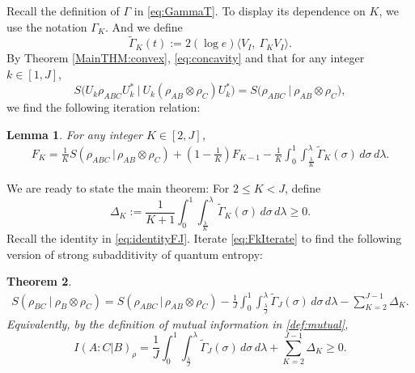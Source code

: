 \documentclass{article}
\numberwithin{equation}{section}
\newtheorem{theorem}{Theorem}[section]
\newtheorem{lemma}[theorem]{Lemma}
\begin{document}
Recall the definition of $\Gamma$ in \eqref{eq:GammaT}. To display its dependence on $K$, we use the notation $\Gamma_{K}$. And we define
\begin{equation}
\tilde{\Gamma}_{K}(t):=2(\log e) \big\langle V_{I},\ \Gamma_{K}V_{I}\big\rangle.
\end{equation}
By Theorem \ref{MainTHM:convex}, \eqref{eq:concavity} and that
for any integer $k\in [1,J]$,
\begin{equation*}
  S\big(  U_k \rho_{ABC} U_k^* \ \big|\  U_k (\rho_{AB} \otimes \rho_{C}) U_k^* \big)=S\big(   \rho_{ABC}  \ \big|\  \rho_{AB} \otimes \rho_{C}  \big),
\end{equation*}
we find the following iteration relation:
\begin{lemma} For any integer $K\in [2,J]$,
  \begin{align}\label{eq:FkIterate}
    F_{K}=\frac{1}{K} S(\rho_{ABC} \, | \, \rho_{AB} \otimes \rho_{C})+(1-\frac{1}{K})F_{K-1}-\frac{1}{K} \int_0^1 \int_{\frac{\lambda}{K}}^{\lambda} \tilde{\Gamma}_K(\sigma) \, d\sigma \, d\lambda.
  \end{align}
\end{lemma}


We are ready to state the main theorem:
For $2 \le K < J$, define
\begin{equation}
    \Delta_K := \frac{1}{K+1}  \int_{0}^{1} \int_{\frac{\lambda}{K}}^{\lambda} \tilde{\Gamma}_{K}(\sigma) \, d\sigma \, d\lambda\geq 0.
\end{equation} Recall the identity in \eqref{eq:identityFJ}. Iterate \eqref{eq:FkIterate} to find the following version of strong subadditivity of quantum entropy:
\begin{theorem}\label{MainTHM:Mutual}
  \begin{align}
      S( \rho_{BC} \ |\  \rho_B \otimes \rho_C )=S(\rho_{ABC} \, | \, \rho_{AB}\otimes \rho_C)-\frac{1}{J} \int_{0}^{1} \int_{\frac{\lambda}{J}}^{\lambda} \tilde{\Gamma}_J(\sigma) \, d\sigma \, d\lambda  - \sum_{K=2}^{J-1} \Delta_K.
  \end{align}
Equivalently, by the definition of mutual information in \eqref{def:mutual},
\begin{equation}\label{eq:mutual}
  I(A:C|B)_{\rho}=\frac{1}{J} \int_{0}^{1} \int_{\frac{\lambda}{J}}^{\lambda} \tilde{\Gamma}_J(\sigma) \, d\sigma \, d\lambda  + \sum_{K=2}^{J-1} \Delta_K\geq 0.
\end{equation}
\end{theorem}
\end{document}
